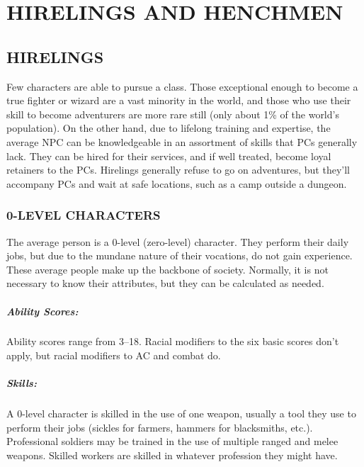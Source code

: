 \chapter{HIRELINGS AND HENCHMEN}

\begin{multicols}{2}

\section{HIRELINGS}

Few characters are able to pursue a class.  Those exceptional enough to become a true fighter or wizard are a vast minority in the world, and those who use their skill to become adventurers are more rare still (only about 1\% of the world's population).  On the other hand, due to lifelong training and expertise, the average NPC can be knowledgeable in an assortment of skills that PCs generally lack.  They can be hired for their services, and if well treated, become loyal retainers to the PCs.  Hirelings generally refuse to go on adventures, but they'll accompany PCs and wait at safe locations, such as a camp outside a dungeon.

\subsection{0-LEVEL CHARACTERS}

The average person is a 0-level (zero-level) character.  They perform their daily jobs, but due to the mundane nature of their vocations, do not gain experience.  These average people make up the backbone of society.  Normally, it is not necessary to know their attributes, but they can be calculated as needed.

\paragraph{Ability Scores:} Ability scores range from 3--18.  Racial modifiers to the six basic scores don't apply, but racial modifiers to AC and combat do.

\paragraph{Skills:} A 0-level character is skilled in the use of one weapon, usually a tool they use to perform their jobs (sickles for farmers, hammers for blacksmiths, etc.).  Professional soldiers may be trained in the use of multiple ranged and melee weapons.  Skilled workers are skilled in whatever profession they might have.  


\end{multicols}
